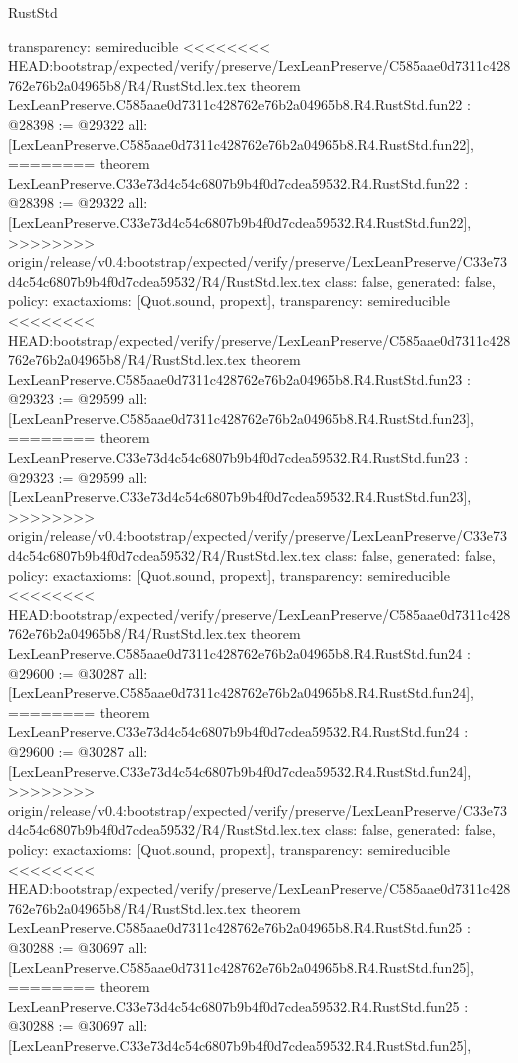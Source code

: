 \begin{lexlean}{RustStd}
\begin{coremodule}
{\begin{coremodule}
{{{{{{{{{{{{{{{{{{{{{{{{{  transparency: semireducible
}
<<<<<<<< HEAD:bootstrap/expected/verify/preserve/LexLeanPreserve/C585aae0d7311c428762e76b2a04965b8/R4/RustStd.lex.tex
theorem LexLeanPreserve.C585aae0d7311c428762e76b2a04965b8.R4.RustStd.fun22 : @28398 := @29322 {
  all: [LexLeanPreserve.C585aae0d7311c428762e76b2a04965b8.R4.RustStd.fun22],
========
theorem LexLeanPreserve.C33e73d4c54c6807b9b4f0d7cdea59532.R4.RustStd.fun22 : @28398 := @29322 {
  all: [LexLeanPreserve.C33e73d4c54c6807b9b4f0d7cdea59532.R4.RustStd.fun22],
>>>>>>>> origin/release/v0.4:bootstrap/expected/verify/preserve/LexLeanPreserve/C33e73d4c54c6807b9b4f0d7cdea59532/R4/RustStd.lex.tex
  class: false,
  generated: false,
  policy: exact{axioms: [Quot.sound, propext]},
  transparency: semireducible
}
<<<<<<<< HEAD:bootstrap/expected/verify/preserve/LexLeanPreserve/C585aae0d7311c428762e76b2a04965b8/R4/RustStd.lex.tex
theorem LexLeanPreserve.C585aae0d7311c428762e76b2a04965b8.R4.RustStd.fun23 : @29323 := @29599 {
  all: [LexLeanPreserve.C585aae0d7311c428762e76b2a04965b8.R4.RustStd.fun23],
========
theorem LexLeanPreserve.C33e73d4c54c6807b9b4f0d7cdea59532.R4.RustStd.fun23 : @29323 := @29599 {
  all: [LexLeanPreserve.C33e73d4c54c6807b9b4f0d7cdea59532.R4.RustStd.fun23],
>>>>>>>> origin/release/v0.4:bootstrap/expected/verify/preserve/LexLeanPreserve/C33e73d4c54c6807b9b4f0d7cdea59532/R4/RustStd.lex.tex
  class: false,
  generated: false,
  policy: exact{axioms: [Quot.sound, propext]},
  transparency: semireducible
}
<<<<<<<< HEAD:bootstrap/expected/verify/preserve/LexLeanPreserve/C585aae0d7311c428762e76b2a04965b8/R4/RustStd.lex.tex
theorem LexLeanPreserve.C585aae0d7311c428762e76b2a04965b8.R4.RustStd.fun24 : @29600 := @30287 {
  all: [LexLeanPreserve.C585aae0d7311c428762e76b2a04965b8.R4.RustStd.fun24],
========
theorem LexLeanPreserve.C33e73d4c54c6807b9b4f0d7cdea59532.R4.RustStd.fun24 : @29600 := @30287 {
  all: [LexLeanPreserve.C33e73d4c54c6807b9b4f0d7cdea59532.R4.RustStd.fun24],
>>>>>>>> origin/release/v0.4:bootstrap/expected/verify/preserve/LexLeanPreserve/C33e73d4c54c6807b9b4f0d7cdea59532/R4/RustStd.lex.tex
  class: false,
  generated: false,
  policy: exact{axioms: [Quot.sound, propext]},
  transparency: semireducible
}
<<<<<<<< HEAD:bootstrap/expected/verify/preserve/LexLeanPreserve/C585aae0d7311c428762e76b2a04965b8/R4/RustStd.lex.tex
theorem LexLeanPreserve.C585aae0d7311c428762e76b2a04965b8.R4.RustStd.fun25 : @30288 := @30697 {
  all: [LexLeanPreserve.C585aae0d7311c428762e76b2a04965b8.R4.RustStd.fun25],
========
theorem LexLeanPreserve.C33e73d4c54c6807b9b4f0d7cdea59532.R4.RustStd.fun25 : @30288 := @30697 {
  all: [LexLeanPreserve.C33e73d4c54c6807b9b4f0d7cdea59532.R4.RustStd.fun25],
}}}}}}}}}}}}}}}}}}}}}}}}}}}}}
\end{coremodule}}
\end{coremodule}
\end{lexlean}
